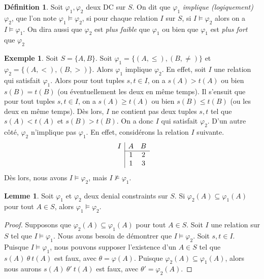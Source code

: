\documentclass[letterpaper, 12pt]{report}
\theoremstyle{definition}
\newtheorem{mydef}{Définition}
\newtheorem{mylemma}{Lemme}
\newtheorem{myexample}{Exemple}
\begin{document}
\begin{mydef}
Soit $\varphi_1,\varphi_2$ deux DC sur $S$. On dit que $\varphi_1$ \emph{implique (logiquement)} $\varphi_2$, que l'on note $\varphi_1 \models\varphi_2$, si pour chaque relation $I$ sur $S$, si $I \models \varphi_2$ alors on a $I \models \varphi_1$. On dira aussi que $\varphi_2$ est \emph{plus faible} que $\varphi_1$ ou bien que $\varphi_1$ est \emph{plus fort} que $\varphi_2$
\end{mydef}

\begin{myexample}

Soit $S=\{A,B\}$.
Soit $\varphi_1=\{(A,\leq),(B,\neq)\}$ et $\varphi_2=\{(A,<),(B,>)\}$.
Alors $\varphi_1$ implique $\varphi_2$.
En effet, soit $I$ une relation qui satisfait $\varphi_1$.
Alors pour tout tuples $s,t\in I$, on a $s(A)>t(A)$ ou bien $s(B)=t(B)$ (ou éventuellement les deux en même temps).
Il s'ensuit que pour tout tuples $s,t\in I$, on a $s(A)\geq t(A)$ ou bien $s(B)\leq t(B)$ (ou les deux en même temps).
Dès lors, $I$ ne contient pas deux tuples $s,t$ tel que  $s(A)<t(A)$ et $s(B)>t(B)$.
On a donc $I$ qui satisfait $\varphi_2$.
D'un autre côté, $\varphi_2$ n'implique pas $\varphi_1$.
En effet, considérons la relation $I$ suivante.
$$
\begin{array}{c|cc}
I & A & B\\\cline{2-3}
  & 1 & 2\\
  & 1 & 3
\end{array}  
$$
Dès lors, nous avons $I\models\varphi_2$, mais $I\not\models\varphi_1$.
\end{myexample}

\begin{mylemma}\label{lem:characterization}
Soit $\varphi_1$ et $\varphi_2$ deux denial constraints sur $S$.
Si $\varphi_2(A)\subseteq\varphi_1(A)$ pour tout $ A\in S$, alors $\varphi_1\models\varphi_2$.
\end{mylemma}
\begin{proof}
Supposons que $\varphi_2(A)\subseteq\varphi_1(A)$ pour tout $A\in S$.
Soit $I$ une relation sur $S$ tel que $I\models\varphi_1$.
Nous avons besoin de démontrer que $I\models\varphi_2$.
Soit $s,t\in I$.
Puisque $I\models\varphi_1$, nous pouvons supposer l'existence d'un $A\in S$ tel que $s(A)\ \theta\ t(A)$ est faux, avec $\theta=\varphi(A)$. 
Puisque $\varphi_2(A)\subseteq\varphi_1(A)$,
alors nous aurons $s(A)\ \theta'\ t(A)$ est faux, avec $\theta'=\varphi_2(A)$.
\end{proof}
\end{document}
